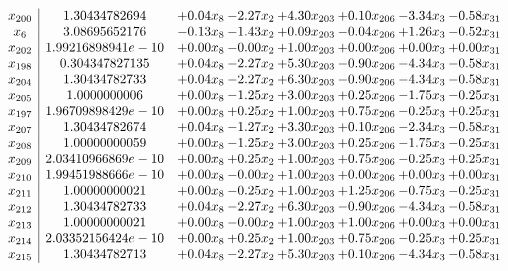 \documentclass[8pt]{article}
\begin{document}
\[\begin{array}{c| c c@{\hskip 2pt} c@{\hskip 2pt} c@{\hskip 2pt} c@{\hskip 2pt} c@{\hskip 2pt} c@{\hskip 2pt} }
 x_{200}   &  1.30434782694 & +  0.04 x_{8} & -2.27 x_{2} & +  4.30 x_{203} & +  0.10 x_{206} & -3.34 x_{3} & -0.58 x_{31}\\
 x_{6}   &  3.08695652176 & -0.13 x_{8} & -1.43 x_{2} & +  0.09 x_{203} & -0.04 x_{206} & +  1.26 x_{3} & -0.52 x_{31}\\
 x_{202}   &  1.99216898941e-10 & +  0.00 x_{8} & -0.00 x_{2} & +  1.00 x_{203} & +  0.00 x_{206} & +  0.00 x_{3} & +  0.00 x_{31}\\
 x_{198}   &  0.304347827135 & +  0.04 x_{8} & -2.27 x_{2} & +  5.30 x_{203} & -0.90 x_{206} & -4.34 x_{3} & -0.58 x_{31}\\
 x_{204}   &  1.30434782733 & +  0.04 x_{8} & -2.27 x_{2} & +  6.30 x_{203} & -0.90 x_{206} & -4.34 x_{3} & -0.58 x_{31}\\
 x_{205}   &  1.0000000006 & +  0.00 x_{8} & -1.25 x_{2} & +  3.00 x_{203} & +  0.25 x_{206} & -1.75 x_{3} & -0.25 x_{31}\\
 x_{197}   &  1.96709898429e-10 & +  0.00 x_{8} & +  0.25 x_{2} & +  1.00 x_{203} & +  0.75 x_{206} & -0.25 x_{3} & +  0.25 x_{31}\\
 x_{207}   &  1.30434782674 & +  0.04 x_{8} & -1.27 x_{2} & +  3.30 x_{203} & +  0.10 x_{206} & -2.34 x_{3} & -0.58 x_{31}\\
 x_{208}   &  1.00000000059 & +  0.00 x_{8} & -1.25 x_{2} & +  3.00 x_{203} & +  0.25 x_{206} & -1.75 x_{3} & -0.25 x_{31}\\
 x_{209}   &  2.03410966869e-10 & +  0.00 x_{8} & +  0.25 x_{2} & +  1.00 x_{203} & +  0.75 x_{206} & -0.25 x_{3} & +  0.25 x_{31}\\
 x_{210}   &  1.99451988666e-10 & +  0.00 x_{8} & -0.00 x_{2} & +  1.00 x_{203} & +  0.00 x_{206} & +  0.00 x_{3} & +  0.00 x_{31}\\
 x_{211}   &  1.00000000021 & +  0.00 x_{8} & -0.25 x_{2} & +  1.00 x_{203} & +  1.25 x_{206} & -0.75 x_{3} & -0.25 x_{31}\\
 x_{212}   &  1.30434782733 & +  0.04 x_{8} & -2.27 x_{2} & +  6.30 x_{203} & -0.90 x_{206} & -4.34 x_{3} & -0.58 x_{31}\\
 x_{213}   &  1.00000000021 & +  0.00 x_{8} & -0.00 x_{2} & +  1.00 x_{203} & +  1.00 x_{206} & +  0.00 x_{3} & +  0.00 x_{31}\\
 x_{214}   &  2.03352156424e-10 & +  0.00 x_{8} & +  0.25 x_{2} & +  1.00 x_{203} & +  0.75 x_{206} & -0.25 x_{3} & +  0.25 x_{31}\\
 x_{215}   &  1.30434782713 & +  0.04 x_{8} & -2.27 x_{2} & +  5.30 x_{203} & +  0.10 x_{206} & -4.34 x_{3} & -0.58 x_{31}\\

\end{array}\]
\end{document}
